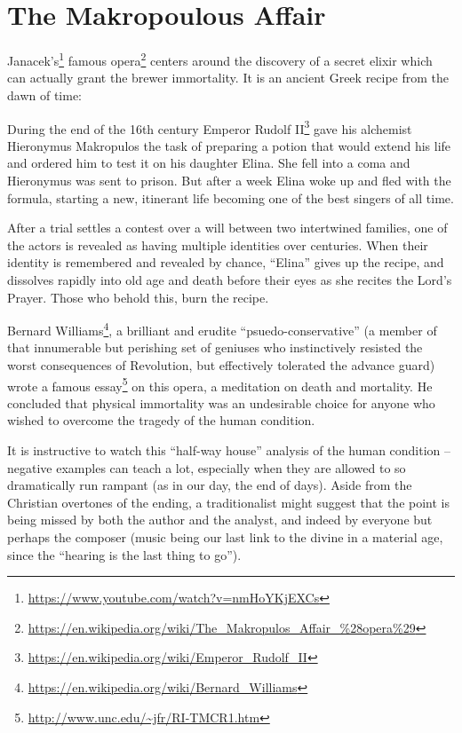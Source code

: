 \section{The Makropoulous Affair}

Janacek's\footnote{\url{https://www.youtube.com/watch?v=nmHoYKjEXCs}} famous opera\footnote{\url{https://en.wikipedia.org/wiki/The\_Makropulos\_Affair\_\%28opera\%29}} centers around the discovery of a secret elixir which can actually grant the brewer immortality. It is an ancient Greek recipe from the dawn of time:

\begin{quotex}
During the end of the 16th century Emperor Rudolf II\footnote{\url{https://en.wikipedia.org/wiki/Emperor\_Rudolf\_II}} gave his alchemist Hieronymus Makropulos the task of preparing a potion that would extend his life and ordered him to test it on his daughter Elina. She fell into a coma and Hieronymus was sent to prison. But after a week Elina woke up and fled with the formula, starting a new, itinerant life becoming one of the best singers of all time.
\end{quotex}


After a trial settles a contest over a will between two intertwined families, one of the actors is revealed as having multiple identities over centuries. When their identity is remembered and revealed by chance, ``Elina'' gives up the recipe, and dissolves rapidly into old age and death before their eyes as she recites the Lord's Prayer. Those who behold this, burn the recipe.

Bernard Williams\footnote{\url{https://en.wikipedia.org/wiki/Bernard\_Williams}}, a brilliant and erudite ``psuedo-conservative'' (a member of that innumerable but perishing set of geniuses who instinctively resisted the worst consequences of Revolution, but effectively tolerated the advance guard) wrote a famous essay\footnote{\url{http://www.unc.edu/~jfr/RI-TMCR1.htm}} on this opera, a meditation on death and mortality. He concluded that physical immortality was an undesirable choice for anyone who wished to overcome the tragedy of the human condition.

It is instructive to watch this ``half-way house'' analysis of the human condition -- negative examples can teach a lot, especially when they are allowed to so dramatically run rampant (as in our day, the end of days). Aside from the Christian overtones of the ending, a traditionalist might suggest that the point is being missed by both the author and the analyst, and indeed by everyone but perhaps the composer (music being our last link to the divine in a material age, since the ``hearing is the last thing to go'').

